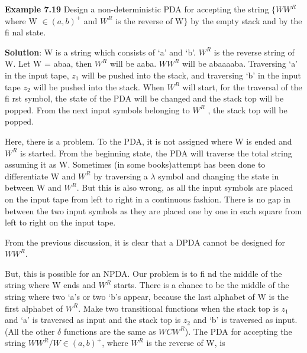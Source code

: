 \documentclass{article}
\begin{document}
\begin{flushleft}
	\textbf{Example 7.19} \hspace{5mm} Design a non-deterministic PDA for accepting the string $\lbrace$$WW^{R}$ where  W $\in$$(a, b)^{+}$ and $W^{R}$ is the reverse of W$\rbrace$ by the empty stack and by the fi nal state.
\end{flushleft}
	\begin{flushleft}
		\textbf{Solution}: W is a string which consists of ‘a’ and ‘b’. $W^{R}$ is the reverse string of W. Let W = abaa, then
		$W^{R}$ will be aaba. $WW^{R}$ will be abaaaaba. Traversing ‘a’ in the input tape, $z_1$ will be pushed into the stack,
		and traversing ‘b’ in the input tape $z_2$ will be pushed into the stack. When $W^{R}$ will start, for the traversal
		of the fi rst symbol, the state of the PDA will be changed and the stack top will be popped. From the next input symbols belonging to $W^{R}$ , the stack top will be popped.
		
		
	\hspace{5mm}Here, there is a problem. To the PDA, it is not assigned where W is ended and $W^{R}$ is started. From
		the beginning state, the PDA will traverse the total string assuming it as W. Sometimes (in some books)attempt has been done to differentiate W and $W^{R}$ by traversing a $\lambda$ symbol and changing the state in
		between W and $W^{R}$. But this is also wrong, as all the input symbols are placed on the input tape from
		left to right in a continuous fashion. There is no gap in between the two input symbols as they are placed
		one by one in each square from left to right on the input tape.
		
		\hspace{5mm}From the previous discussion, it is clear that a DPDA cannot be designed for $WW^{R}$.
		
		
		\hspace{5mm}But, this is possible for an NPDA. Our problem is to fi nd the middle of the string where W ends and $W^{R}$ starts. There is a chance to be the middle of the string where two ‘a’s or two ‘b’s appear, because the last alphabet of W is the first alphabet of $W^{R}$. Make two transitional functions when the stack top is $z_1$ and ‘a’
		is traversed as input and the stack top is $z_2$ and ‘b’ is traversed as input. (All the other $\delta$ functions are the same as $WCW^{R}$). The PDA for accepting the string $WW^{R} /W $$\in$$(a, b)^{+}$, where $W^{R}$ is the reverse of W, is
		
	\end{flushleft}
	
\end{document}
